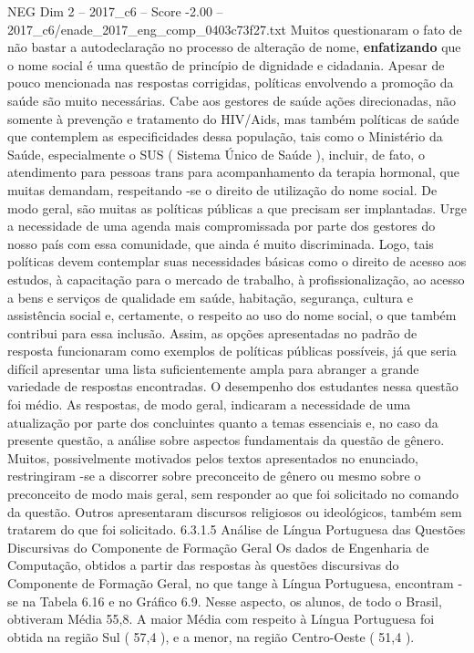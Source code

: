 \begin{textsample}{NEG Dim 2 – 2017\_c6 – Score -2.00 – 2017\_c6/enade\_2017\_eng\_comp\_0403c73f27.txt}
Muitos questionaram o fato de não bastar a autodeclaração no processo de alteração de nome, \textbf{enfatizando} que o nome social é uma questão de princípio de dignidade e cidadania.
Apesar de pouco mencionada nas respostas corrigidas, políticas envolvendo a promoção da saúde são muito necessárias.
Cabe aos gestores de saúde ações direcionadas, não somente à prevenção e tratamento do HIV/Aids, mas também políticas de saúde que contemplem as especificidades dessa população, tais como o Ministério da Saúde, especialmente o SUS ( Sistema Único de Saúde ), incluir, de fato, o atendimento para pessoas trans para acompanhamento da terapia hormonal, que muitas demandam, respeitando -se o direito de utilização do nome social.
De modo geral, são muitas as políticas públicas a que precisam ser implantadas.
Urge a necessidade de uma agenda mais compromissada por parte dos gestores do nosso país com essa comunidade, que ainda é muito discriminada.
Logo, tais políticas devem contemplar suas necessidades básicas como o direito de acesso aos estudos, à capacitação para o mercado de trabalho, à profissionalização, ao acesso a bens e serviços de qualidade em saúde, habitação, segurança, cultura e assistência social e, certamente, o respeito ao uso do nome social, o que também contribui para essa inclusão.
Assim, as opções apresentadas no padrão de resposta funcionaram como exemplos de políticas públicas possíveis, já que seria difícil apresentar uma lista suficientemente ampla para abranger a grande variedade de respostas encontradas.
O desempenho dos estudantes nessa questão foi médio.
As respostas, de modo geral, indicaram a necessidade de uma atualização por parte dos concluintes quanto a temas essenciais e, no caso da presente questão, a análise sobre aspectos fundamentais da questão de gênero.
Muitos, possivelmente motivados pelos textos apresentados no enunciado, restringiram -se a discorrer sobre preconceito de gênero ou mesmo sobre o preconceito de modo mais geral, sem responder ao que foi solicitado no comando da questão.
Outros apresentaram discursos religiosos ou ideológicos, também sem tratarem do que foi solicitado. 6.3.1.5 Análise de Língua Portuguesa das Questões Discursivas do Componente de Formação Geral Os dados de Engenharia de Computação, obtidos a partir das respostas às questões discursivas do Componente de Formação Geral, no que tange à Língua Portuguesa, encontram -se na Tabela 6.16 e no Gráfico 6.9.
Nesse aspecto, os alunos, de todo o Brasil, obtiveram Média 55,8.
A maior Média com respeito à Língua Portuguesa foi obtida na região Sul ( 57,4 ), e a menor, na região Centro-Oeste ( 51,4 ).

\end{textsample}
